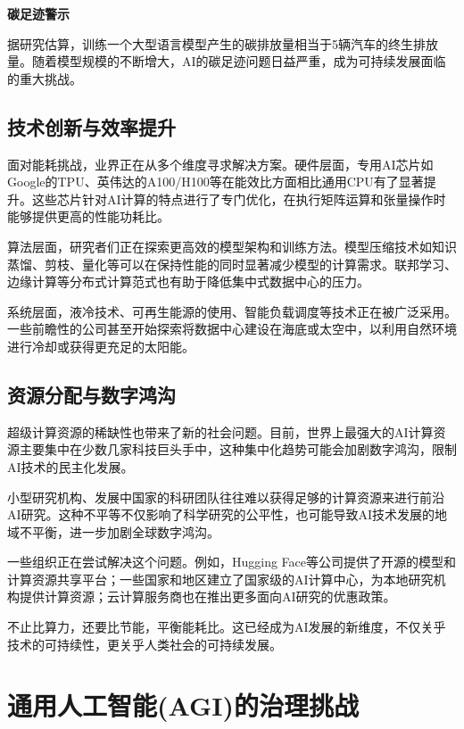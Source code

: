 \begin{warnbox}
{\bf 碳足迹警示}

据研究估算，训练一个大型语言模型产生的碳排放量相当于5辆汽车的终生排放量。随着模型规模的不断增大，AI的碳足迹问题日益严重，成为可持续发展面临的重大挑战。
\end{warnbox}

\subsection{技术创新与效率提升}

面对能耗挑战，业界正在从多个维度寻求解决方案。硬件层面，专用AI芯片如Google的TPU、英伟达的A100/H100等在能效比方面相比通用CPU有了显著提升。这些芯片针对AI计算的特点进行了专门优化，在执行矩阵运算和张量操作时能够提供更高的性能功耗比。

算法层面，研究者们正在探索更高效的模型架构和训练方法。模型压缩技术如知识蒸馏、剪枝、量化等可以在保持性能的同时显著减少模型的计算需求。联邦学习、边缘计算等分布式计算范式也有助于降低集中式数据中心的压力。

系统层面，液冷技术、可再生能源的使用、智能负载调度等技术正在被广泛采用。一些前瞻性的公司甚至开始探索将数据中心建设在海底或太空中，以利用自然环境进行冷却或获得更充足的太阳能。

\subsection{资源分配与数字鸿沟}

超级计算资源的稀缺性也带来了新的社会问题。目前，世界上最强大的AI计算资源主要集中在少数几家科技巨头手中，这种集中化趋势可能会加剧数字鸿沟，限制AI技术的民主化发展。

小型研究机构、发展中国家的科研团队往往难以获得足够的计算资源来进行前沿AI研究。这种不平等不仅影响了科学研究的公平性，也可能导致AI技术发展的地域不平衡，进一步加剧全球数字鸿沟。

一些组织正在尝试解决这个问题。例如，Hugging Face等公司提供了开源的模型和计算资源共享平台；一些国家和地区建立了国家级的AI计算中心，为本地研究机构提供计算资源；云计算服务商也在推出更多面向AI研究的优惠政策。

不止比算力，还要比节能，平衡能耗比。这已经成为AI发展的新维度，不仅关乎技术的可持续性，更关乎人类社会的可持续发展。

\section{通用人工智能(AGI)的治理挑战}


